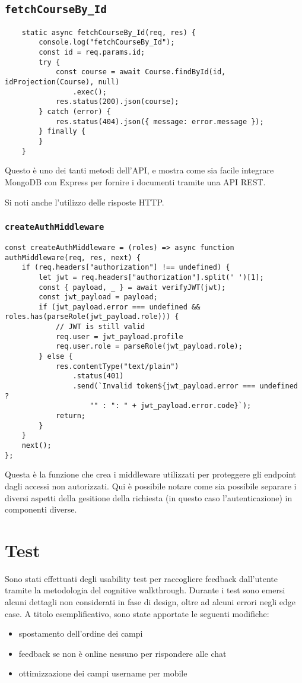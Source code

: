 \documentclass{report}
\begin{document}
\subsection{\texttt{fetchCourseBy\_Id}}
\begin{verbatim}
    static async fetchCourseBy_Id(req, res) {
        console.log("fetchCourseBy_Id");
        const id = req.params.id;
        try {
            const course = await Course.findById(id, idProjection(Course), null)
                .exec();
            res.status(200).json(course);
        } catch (error) {
            res.status(404).json({ message: error.message });
        } finally {
        }
    }
\end{verbatim}
\par Questo è uno dei tanti metodi dell'API, e mostra come sia facile integrare MongoDB con Express per fornire i documenti tramite una API REST.
\par Si noti anche l'utilizzo delle risposte HTTP.
\subsubsection{\texttt{createAuthMiddleware}}
\begin{verbatim}
const createAuthMiddleware = (roles) => async function authMiddleware(req, res, next) {
    if (req.headers["authorization"] !== undefined) {
        let jwt = req.headers["authorization"].split(' ')[1];
        const { payload, _ } = await verifyJWT(jwt);
        const jwt_payload = payload;
        if (jwt_payload.error === undefined && roles.has(parseRole(jwt_payload.role))) {
            // JWT is still valid
            req.user = jwt_payload.profile
            req.user.role = parseRole(jwt_payload.role);
        } else {
            res.contentType("text/plain")
                .status(401)
                .send(`Invalid token${jwt_payload.error === undefined ?
                    "" : ": " + jwt_payload.error.code}`);
            return;
        }
    }
    next();
};
\end{verbatim}
\par Questa è la funzione che crea i middleware utilizzati per proteggere gli endpoint dagli accessi non autorizzati. Qui è possibile notare come sia possibile separare i diversi aspetti della gesitione della richiesta (in questo caso l'autenticazione) in componenti diverse.
\section{Test}
\par Sono stati effettuati degli usability test per raccogliere feedback dall'utente tramite la metodologia del cognitive walkthrough. Durante i test sono emersi alcuni dettagli non considerati in fase di design, oltre ad alcuni errori negli edge case. A titolo esemplificativo, sono state apportate le seguenti modifiche:
\begin{itemize}
    \item spostamento dell'ordine dei campi
    \item feedback se non è online nessuno per rispondere alle chat
    \item ottimizzazione dei campi username per mobile
\end{itemize}
\end{document}
